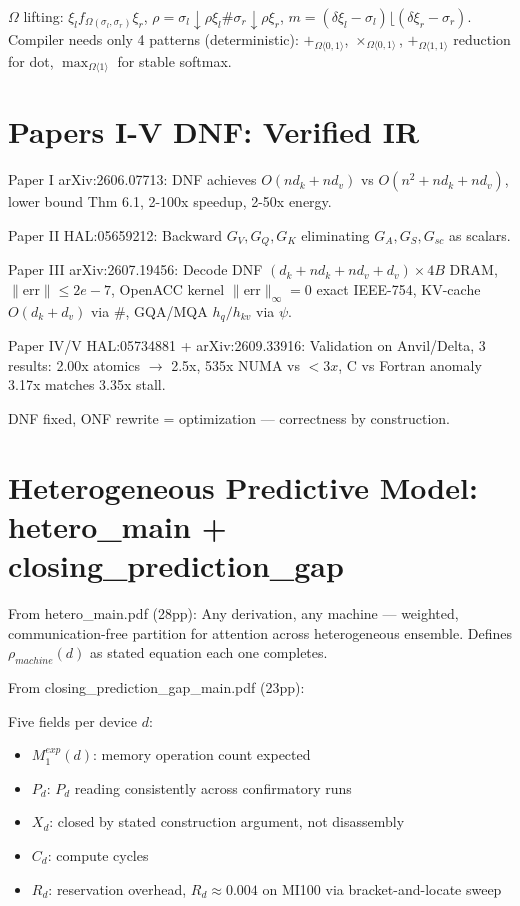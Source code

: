 \documentclass[11pt,a4paper]{article}
\begin{document}
$\Omega$ lifting: $\xi_l f_{\Omega(\sigma_l,\sigma_r)}\xi_r$, $\rho=\sigma_l\downarrow\rho\xi_l\#\sigma_r\downarrow\rho\xi_r$, $m=(\delta\xi_l-\sigma_l)\lfloor(\delta\xi_r-\sigma_r)$. Compiler needs only 4 patterns (deterministic): $+_{\Omega\langle0,1\rangle}$, $\times_{\Omega\langle0,1\rangle}$, $+_{\Omega\langle1,1\rangle}$ reduction for dot, $\max_{\Omega\langle1\rangle}$ for stable softmax.

\section{Papers I-V DNF: Verified IR}

Paper I arXiv:2606.07713: DNF achieves $O(nd_k+nd_v)$ vs $O(n^2+nd_k+nd_v)$, lower bound Thm 6.1, 2-100x speedup, 2-50x energy.

Paper II HAL:05659212: Backward $G_V,G_Q,G_K$ eliminating $G_A,G_S,G_{sc}$ as scalars.

Paper III arXiv:2607.19456: Decode DNF $(d_k+nd_k+nd_v+d_v)\times4B$ DRAM, $\|\text{err}\|\le2e-7$, OpenACC kernel $\|\text{err}\|_\infty=0$ exact IEEE-754, KV-cache $O(d_k+d_v)$ via $\#$, GQA/MQA $h_q/h_{kv}$ via $\psi$.

Paper IV/V HAL:05734881 + arXiv:2609.33916: Validation on Anvil/Delta, 3 results: 2.00x atomics $\rightarrow$ 2.5x, 535x NUMA vs $<3x$, C vs Fortran anomaly 3.17x matches 3.35x stall.

DNF fixed, ONF rewrite = optimization — correctness by construction.

\section{Heterogeneous Predictive Model: hetero\_main + closing\_prediction\_gap}

From hetero\_main.pdf (28pp): Any derivation, any machine — weighted, communication-free partition for attention across heterogeneous ensemble. Defines $\rho_{machine}(d)$ as stated equation each one completes.

From closing\_prediction\_gap\_main.pdf (23pp):

Five fields per device $d$:
\begin{itemize}
\item $M_1^{exp}(d)$: memory operation count expected
\item $P_d$: $P_d$ reading consistently across confirmatory runs
\item $X_d$: closed by stated construction argument, not disassembly
\item $C_d$: compute cycles
\item $R_d$: reservation overhead, $R_d\approx0.004$ on MI100 via bracket-and-locate sweep
\end{itemize}
\end{document}
